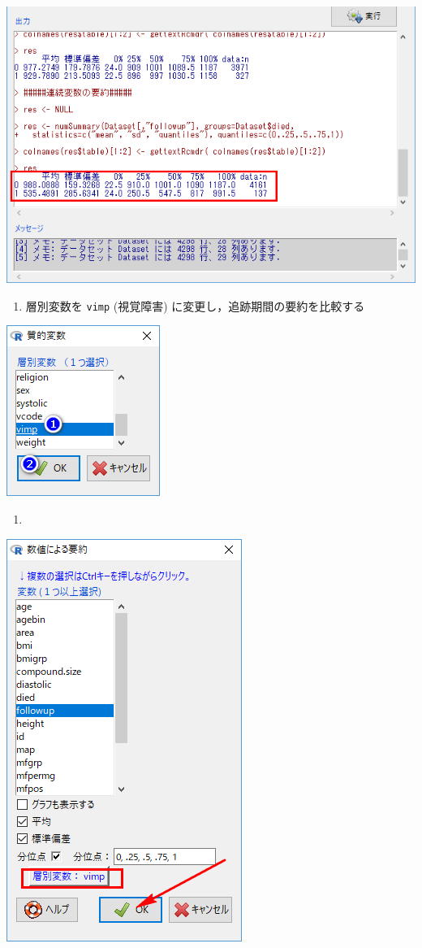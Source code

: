 \documentclass[]{problemset}
\providecommand{\tightlist}{%
  \setlength{\itemsep}{0pt}\setlength{\parskip}{0pt}}
\begin{document}
\begin{center}\includegraphics[width=0.55\linewidth,height=0.35\textheight]{pic/survival06} \end{center}

\newpage

\begin{enumerate}
\def\labelenumi{\arabic{enumi}.}
\setcounter{enumi}{7}
\tightlist
\item
  層別変数を \texttt{vimp} (視覚障害) に変更し，追跡期間の要約を比較する
\end{enumerate}

\begin{center}\includegraphics[width=0.25\linewidth,height=0.35\textheight]{pic/survival0901} \end{center}

\begin{enumerate}
\def\labelenumi{\arabic{enumi}.}
\setcounter{enumi}{8}
\item
\end{enumerate}

\begin{center}\includegraphics[width=0.45\linewidth,height=0.35\textheight]{pic/survival0902} \end{center}
\end{document}
